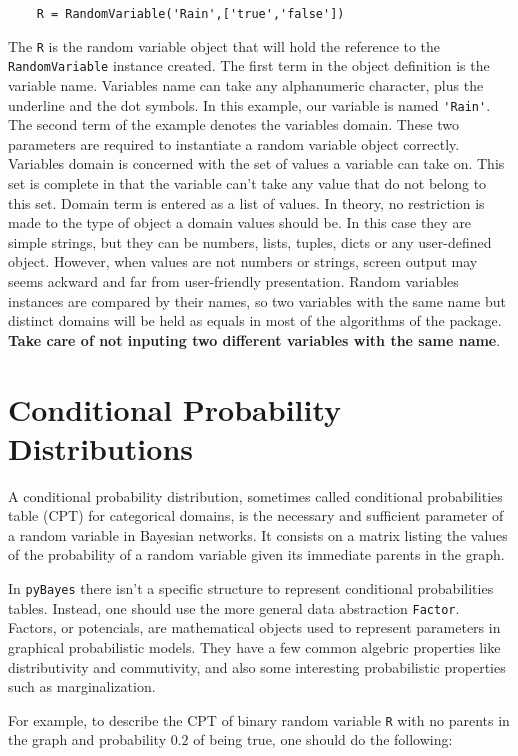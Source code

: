 \documentclass[10pt,a4paper]{report}
\begin{document}
\begin{verbatim}
	R = RandomVariable('Rain',['true','false'])
\end{verbatim}

The \verb|R| is the random variable object that will hold the reference to the \verb|RandomVariable| instance created. The first term in the object definition is the variable name. Variables name can take any alphanumeric character, plus the underline and the dot symbols. In this example, our variable is named \verb|'Rain'|. The second term of the example denotes the variables domain. These two parameters are required to instantiate a random variable object correctly. Variables domain is concerned with the set of values a variable can take on. This set is complete in that the variable can't take any value that do not belong to this set. Domain term is entered as a list of values. In theory, no restriction is made to the type of object a domain values should be. In this case they are simple strings, but they can be numbers, lists, tuples, dicts or any user-defined object. However, when values are not numbers or strings, screen output may seems ackward and far from user-friendly presentation. Random variables instances are compared by their names, so two variables with the same name but distinct domains will be held as equals in most of the algorithms of the package. \textbf{Take care of not inputing two different variables with the same name}.

\section{Conditional Probability Distributions}
\label{sec:cpt}
A conditional probability distribution, sometimes called conditional probabilities table (CPT) for categorical domains, is the necessary and sufficient parameter of a random variable in Bayesian networks. It consists on a matrix listing the values of the probability of a random variable given its immediate parents in the graph.

In \verb|pyBayes| there isn't a specific structure to represent conditional probabilities tables. Instead, one should use the more general data abstraction \verb|Factor|. Factors, or potencials, are mathematical objects used to represent parameters in graphical probabilistic models. They have a few common algebric properties like distributivity and commutivity, and also some interesting probabilistic properties such as marginalization.

For example, to describe the CPT of binary random variable \verb|R| with no parents in the graph and probability $0.2$ of being true, one should do the following:
\end{document}
